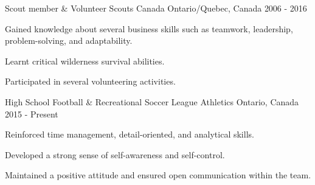 

\begin{cventries}

  \cventry
    {Scout member \& Volunteer} %
    {Scouts Canada} %
    {Ontario/Quebec, Canada} %
    {2006 - 2016} %
    {
      \begin{cvitems} %
        \item {Gained knowledge about several business skills such as teamwork, leadership, problem-solving, and adaptability.}
        \item {Learnt critical wilderness survival abilities.}
        \item {Participated in several volunteering activities.}
      \end{cvitems}
    }

\cventry
  {High School Football \& Recreational Soccer League} %
  {Athletics} %
  {Ontario, Canada} %
  {2015 - Present} %
  {
    \begin{cvitems} %
      \item {Reinforced time management, detail-oriented, and analytical skills.}
      \item {Developed a strong sense of self-awareness and self-control.}
      \item {Maintained a positive attitude and ensured open communication within the team.}
    \end{cvitems}
  }

\end{cventries}
